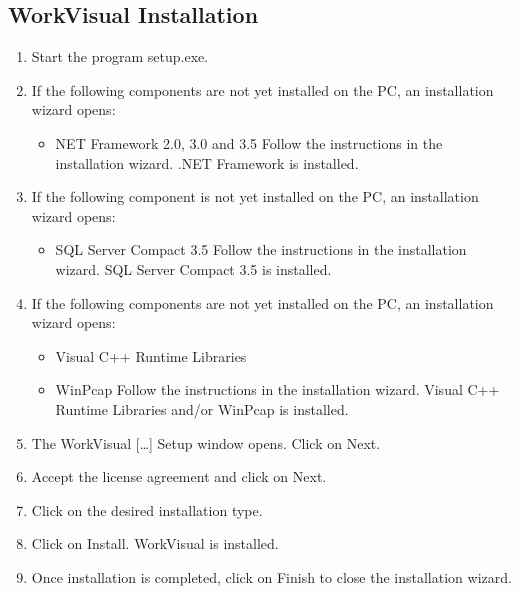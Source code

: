 			\subsection{WorkVisual Installation}
				\begin{enumerate}
					\item Start the program setup.exe.
					\item If the following components are not yet installed on the PC, an installation wizard opens:
						\begin{itemize}
							\item NET Framework 2.0, 3.0 and 3.5
							Follow the instructions in the installation wizard. .NET Framework is installed.
						\end{itemize}
					
					\item If the following component is not yet installed on the PC, an installation wizard opens:
						\begin{itemize}
						\item SQL Server Compact 3.5
						Follow the instructions in the installation wizard. SQL Server Compact 3.5 is installed.
						\end{itemize}
					
					\item If the following components are not yet installed on the PC, an installation wizard opens:
						\begin{itemize}
							\item Visual C++ Runtime Libraries
							\item WinPcap
							Follow the instructions in the installation wizard. Visual C++ Runtime Libraries	and/or WinPcap is installed.
						\end{itemize}
					\item The WorkVisual […] Setup window opens. Click on Next.
					\item Accept the license agreement and click on Next.
					\item Click on the desired installation type.
					\item Click on Install. WorkVisual is installed.	
					\item Once installation is completed, click on Finish to close the installation wizard.
				\end{enumerate}
